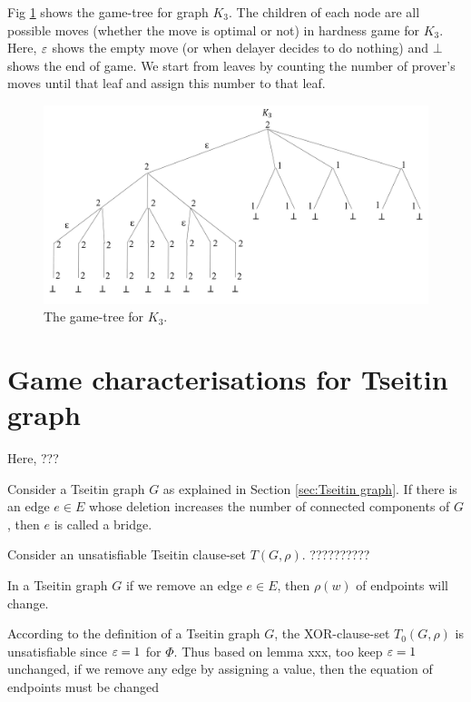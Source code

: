 \documentclass{report}
\begin{document}
\begin{examp}\label{exp:gg1}
Fig \ref{fig:gg1} shows the game-tree for graph $K_3$. The children of each node are all possible moves (whether the move is optimal or not) in hardness game for $K_3$. Here, $\varepsilon $ shows the empty move (or when delayer decides to do nothing) and $\bot$ shows the end of game. We start from leaves by counting the number of prover's moves until that leaf and assign this number to that leaf. 
   \begin{figure}
   \begin{center}
   \includegraphics[scale =0.45]{gg1.png}
   \caption{The game-tree for $K_3$.}
   \label{fig:gg1}
   \end{center}
   \end{figure}
\end{examp}
\section{Game characterisations for Tseitin graph}
\label{sec:hd-game-graph}

Here, ???

\begin{defi}\label{def:bridge}
Consider a Tseitin graph $G$ as explained in Section \ref{sec:Tseitin graph}. If there is an edge $e \in E$ whose deletion increases the number of connected components of $G$, then $e$ is called a bridge.
\end{defi} 

Consider an unsatisfiable Tseitin clause-set $T(G,\rho)$. ??????????

\begin{lem}\label{lem:game3}
In a Tseitin graph $G$ if we remove an edge $e \in E$, then $\rho(w)$ of endpoints will change. 
\end{lem}
\begin{prf}
According to the definition of a Tseitin graph $G$, the XOR-clause-set $T_0(G,\rho)$ is unsatisfiable since $\varepsilon=1$ for $\Phi$. Thus based on lemma xxx, too keep $\varepsilon=1$ unchanged, if we remove any edge by assigning a value, then the equation of endpoints must be changed
\end{prf}
\end{document}
